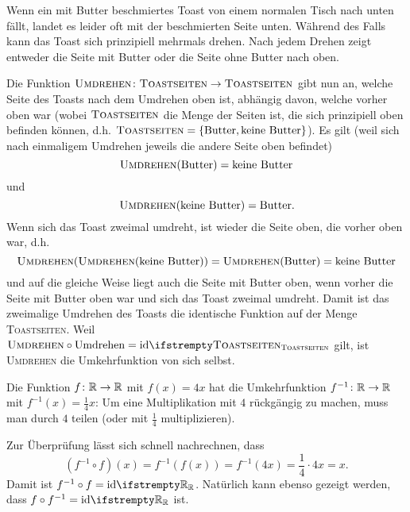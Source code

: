 \documentclass[../../main.tex]{subfiles}
\begin{document}
\begin{example}{}
    Wenn ein mit Butter beschmiertes Toast von einem normalen Tisch nach unten fällt, landet es leider oft mit der beschmierten Seite unten. Während des Falls kann das Toast sich prinzipiell mehrmals drehen. Nach jedem Drehen zeigt entweder die Seite mit Butter oder die Seite ohne Butter nach oben.
    
    Die Funktion $\textsc{Umdrehen}\colon\textsc{Toastseiten}\rightarrow\textsc{Toastseiten}$ gibt nun an, welche Seite des Toasts nach dem Umdrehen oben ist, abhängig davon, welche vorher oben war (wobei $\textsc{Toastseiten}$ die Menge der Seiten ist, die sich prinzipiell oben befinden können, d.h. $\textsc{Toastseiten}=\{\text{Butter},\text{keine Butter}\}$). Es gilt (weil sich nach einmaligem Umdrehen jeweils die andere Seite oben befindet)
    \[\textsc{Umdrehen}(\text{Butter})=\text{keine Butter}\] und \[\textsc{Umdrehen}(\text{keine Butter})=\text{Butter}.\]
    Wenn sich das Toast zweimal umdreht, ist wieder die Seite oben, die vorher oben war, d.h. \[\textsc{Umdrehen}(\textsc{Umdrehen}(\text{keine Butter}))=\textsc{Umdrehen}(\text{Butter})=\text{keine Butter}\]
    und auf die gleiche Weise liegt auch die Seite mit Butter oben, wenn vorher die Seite mit Butter oben war und sich das Toast zweimal umdreht. Damit ist das zweimalige Umdrehen des Toasts die identische Funktion auf der Menge \textsc{Toastseiten}. Weil $\textsc{Umdrehen}\circ \text{Umdrehen}=\ident[\textsc{Toastseiten}]$ gilt, ist \textsc{Umdrehen} die Umkehrfunktion von sich selbst.
\end{example}

\begin{example}{}
    Die Funktion $f\colon\mathbb{R}\rightarrow\mathbb{R}$ mit $f(x)=4x$ hat die Umkehrfunktion $f^{-1}\colon\mathbb{R}\rightarrow\mathbb{R}$ mit $f^{-1}(x)=\frac{1}{4}x$: Um eine Multiplikation mit $4$ rückgängig zu machen, muss man durch $4$ teilen (oder mit $\frac{1}{4}$ multiplizieren).
    
    Zur Überprüfung lässt sich schnell nachrechnen, dass \[(f^{-1}\circ f)(x)=f^{-1}(f(x))=f^{-1}(4x)=\frac{1}{4}\cdot 4x=x.\] 
    Damit ist $f^{-1}\circ f=\ident[\Real]$. Natürlich kann ebenso gezeigt werden, dass $f\circ f^{-1}=\ident[\Real]$ ist.
\end{example}
\end{document}

